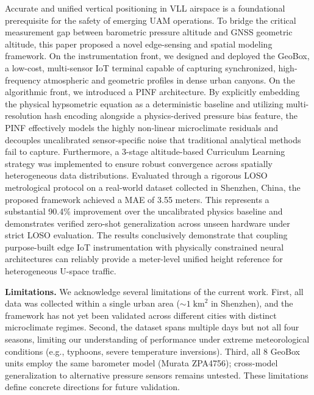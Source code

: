 \documentclass[lettersize,journal]{IEEEtran}
\begin{document}
Accurate and unified vertical positioning in VLL airspace is a foundational prerequisite for the safety of emerging UAM operations. To bridge the critical measurement gap between barometric pressure altitude and GNSS geometric altitude, this paper proposed a novel edge-sensing and spatial modeling framework. 
On the instrumentation front, we designed and deployed the GeoBox, a low-cost, multi-sensor IoT terminal capable of capturing synchronized, high-frequency atmospheric and geometric profiles in dense urban canyons. On the algorithmic front, we introduced a PINF architecture. By explicitly embedding the physical hypsometric equation as a deterministic baseline and utilizing multi-resolution hash encoding alongside a physics-derived pressure bias feature, the PINF effectively models the highly non-linear microclimate residuals and decouples uncalibrated sensor-specific noise that traditional analytical methods fail to capture. Furthermore, a 3-stage altitude-based Curriculum Learning strategy was implemented to ensure robust convergence across spatially heterogeneous data distributions. Evaluated through a rigorous LOSO metrological protocol on a real-world dataset collected in Shenzhen, China, the proposed framework achieved a MAE of 3.55 meters. This represents a substantial 90.4\% improvement over the uncalibrated physics baseline and demonstrates verified zero-shot generalization across unseen hardware under strict LOSO evaluation. The results conclusively demonstrate that coupling purpose-built edge IoT instrumentation with physically constrained neural architectures can reliably provide a meter-level unified height reference for heterogeneous U-space traffic.

\textbf{Limitations.} We acknowledge several limitations of the current work. First, all data was collected within a single urban area (${\sim}1\;\text{km}^2$ in Shenzhen), and the framework has not yet been validated across different cities with distinct microclimate regimes. Second, the dataset spans multiple days but not all four seasons, limiting our understanding of performance under extreme meteorological conditions (e.g., typhoons, severe temperature inversions). Third, all 8 GeoBox units employ the same barometer model (Murata ZPA4756); cross-model generalization to alternative pressure sensors remains untested. These limitations define concrete directions for future validation.
\end{document}
